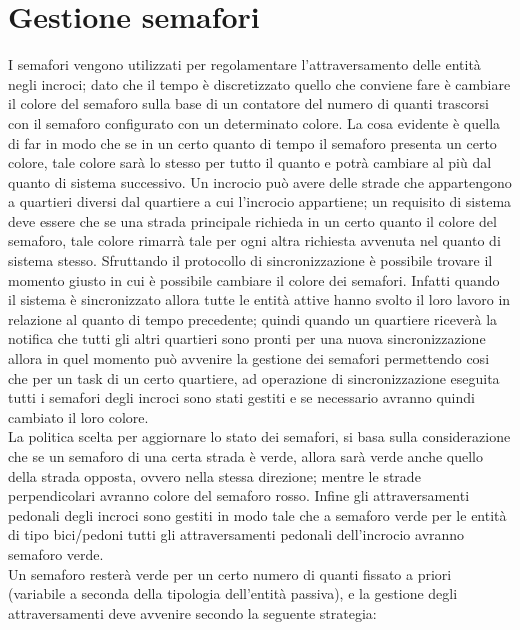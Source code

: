 \section{Gestione semafori}
I semafori vengono utilizzati per regolamentare l'attraversamento delle entità
negli incroci; dato che il tempo è discretizzato quello che conviene fare è
cambiare il colore del semaforo sulla base di un contatore del numero di quanti
trascorsi con il semaforo configurato con un determinato colore. La cosa
evidente è quella di far in modo che se in un certo quanto di tempo il semaforo
presenta un certo colore, tale colore sarà lo stesso per tutto il quanto e
potrà cambiare al più dal quanto di sistema successivo. Un incrocio può avere
delle strade che appartengono a quartieri diversi dal quartiere a cui
l'incrocio appartiene; un requisito di sistema deve essere che se una strada
principale richieda in un certo quanto il colore del semaforo, tale colore
rimarrà tale per ogni altra richiesta avvenuta nel quanto di sistema stesso.
Sfruttando il protocollo di sincronizzazione è possibile trovare il momento
giusto in cui è possibile cambiare il colore dei semafori. Infatti quando il
sistema è sincronizzato allora tutte le entità attive hanno svolto il loro
lavoro in relazione al quanto di tempo precedente; quindi quando un quartiere
riceverà la notifica che tutti gli altri quartieri sono pronti per una nuova
sincronizzazione allora in quel momento può avvenire la gestione dei semafori
permettendo cosi che per un task di un certo quartiere, ad operazione di
sincronizzazione eseguita tutti i semafori degli incroci sono stati gestiti e
se necessario avranno quindi cambiato il loro colore.\\
La politica scelta per aggiornare lo stato dei semafori, si basa sulla
considerazione che se un semaforo di una certa strada è verde, allora sarà
verde anche quello della strada opposta, ovvero nella stessa direzione; mentre
le strade perpendicolari avranno colore del semaforo rosso. Infine gli
attraversamenti pedonali degli incroci sono gestiti in modo tale che a semaforo
verde per le entità di tipo bici/pedoni tutti gli attraversamenti pedonali
dell'incrocio avranno semaforo verde. \\
Un semaforo resterà verde per un certo numero di quanti fissato a priori
(variabile a seconda della tipologia dell'entità passiva), e la gestione degli
attraversamenti deve avvenire secondo la seguente strategia:
